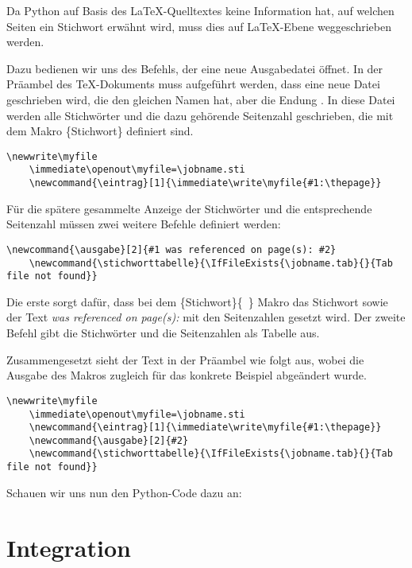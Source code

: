 \documentclass[ngerman]{dtk}
\newcommand{\eintrag}[1]{\immediate\write\myfile{#1:\thepage}}
\newcommand{\ausgabe}[2]{#2}
\newcommand{\stichworttabelle}{\IfFileExists{\jobname.tab}{}{Tab file not found}}
\begin{document}
Da Python auf Basis des \LaTeX-Quelltextes keine Information hat, auf welchen Seiten ein Stichwort erwähnt wird, muss dies auf \LaTeX-Ebene weggeschrieben werden. 

Dazu bedienen wir uns des  Befehls, der eine neue Ausgabedatei öffnet.  In der Präambel des \TeX-Dokuments muss aufgeführt werden, dass eine neue Datei geschrieben wird, die den gleichen Namen hat, aber die Endung . In diese Datei werden alle Stichwörter und die dazu gehörende Seitenzahl geschrieben, 
die mit dem Makro \{Stichwort\}  definiert sind.
\begin{lstlisting}[style=nonumber]
	\newwrite\myfile
	\immediate\openout\myfile=\jobname.sti
	\newcommand{\eintrag}[1]{\immediate\write\myfile{#1:\thepage}}
\end{lstlisting}

Für die spätere gesammelte Anzeige der Stichwörter und die entsprechende Seitenzahl müssen zwei weitere Befehle definiert 
werden:

\begin{lstlisting}[style=nonumber]
	\newcommand{\ausgabe}[2]{#1 was referenced on page(s): #2}
	\newcommand{\stichworttabelle}{\IfFileExists{\jobname.tab}{}{Tab file not found}}
\end{lstlisting}

Die erste sorgt dafür, dass bei dem  \{Stichwort\}\{~\}  Makro das Stichwort sowie der Text 
\emph{was referenced on page(s):} mit den Seitenzahlen gesetzt wird. Der zweite Befehl gibt die Stichwörter und die Seitenzahlen als Tabelle aus.

Zusammengesetzt sieht der Text in der Präambel wie folgt aus,
wobei die Ausgabe des  Makros zugleich für das konkrete Beispiel abgeändert wurde.
\begin{lstlisting}[style=number]
	\newwrite\myfile
	\immediate\openout\myfile=\jobname.sti
	\newcommand{\eintrag}[1]{\immediate\write\myfile{#1:\thepage}}
	\newcommand{\ausgabe}[2]{#2}
	\newcommand{\stichworttabelle}{\IfFileExists{\jobname.tab}{}{Tab file not found}}
\end{lstlisting}

Schauen wir uns nun den Python-Code dazu an:



\section{Integration}
\end{document}
